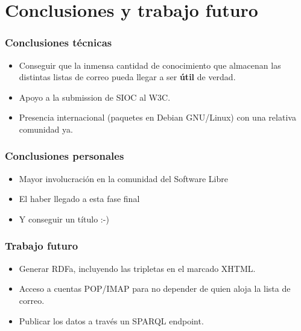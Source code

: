 \documentclass[spanish,notes=hide]{beamer}
\begin{document}
\section{Conclusiones y trabajo futuro}
\frame
{
  \frametitle{Conclusiones técnicas}

  \begin{itemize}
   \item \begin{Large}Conseguir que la inmensa cantidad de conocimiento que almacenan
	 las distintas listas de correo pueda llegar a ser \textbf{útil} de 
         verdad.\end{Large}
   \vspace{1cm}
   \item \begin{Large}Apoyo a la submission de SIOC al W3C.\end{Large}
   \vspace{1cm}
   \item \begin{Large}Presencia internacional (paquetes en Debian GNU/Linux)
	 con una relativa comunidad ya.\end{Large}
  \end{itemize}

}
\frame
{
  \frametitle{Conclusiones personales}

  \begin{itemize}
   \item \begin{Large}Mayor involucración en la comunidad del Software Libre\end{Large}
   \vspace{1cm}
   \item \begin{Large}El haber llegado a esta fase final\end{Large}
   \vspace{1cm}
   \item \begin{Large}Y conseguir un título :-)\end{Large}
  \end{itemize}

}
\frame
{
  \frametitle{Trabajo futuro}

  \begin{itemize}
   \item \begin{Large}Generar RDFa, incluyendo las tripletas en el marcado XHTML.\end{Large}
   \vspace{1cm}
   \item \begin{Large}Acceso a cuentas POP/IMAP para no depender de quien aloja la lista de correo.\end{Large}
   \vspace{1cm}
   \item \begin{Large}Publicar los datos a través un SPARQL endpoint.\end{Large}
  \end{itemize}
}
\end{document}
